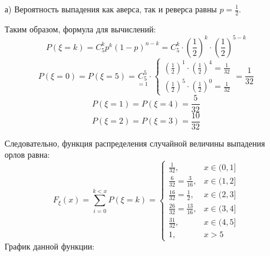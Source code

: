 \begin{enumerate}
	\item[а)] Вероятность выпадения как аверса, так и реверса равны $p = \frac{1}{2}$. 
	
		Таким образом, формула для вычислений:
		\[ P(\xi = k) = C_5^k p^k (1 - p)^{n-k} = C_5^k \cdot \left(\frac{1}{2}\right)^k \cdot \left(\frac{1}{2}\right)^{5-k} \]
		\[ P(\xi = 0) = P(\xi = 5) = \underset{=1}{C_5^5} \cdot 
		\begin{cases}
			\left(\frac{1}{2}\right)^1 \cdot \left(\frac{1}{2}\right)^4 = \frac{1}{32} \\
			\left(\frac{1}{2}\right)^5 \cdot \left(\frac{1}{2}\right)^0 = \frac{1}{32}
		\end{cases}
		= \frac{1}{32}
		\]
		\[ P(\xi = 1) = P(\xi = 4) = \frac{5}{32} \]
		\[ P(\xi = 2) = P(\xi = 3) = \frac{10}{32} \]
		
		Следовательно, функция распределения случайной величины выпадения орлов равна:
		\[
		F_{\xi}(x) = \sum_{i=0}^{k<x} P(\xi = k) =
		\begin{cases}
			\frac{1}{32}, &x \in (0,1] \\
			\frac{6}{32} = \frac{3}{16}, &x \in (1,2] \\
			\frac{16}{32} = \frac{1}{2}, &x \in (2,3] \\
			\frac{26}{32} = \frac{13}{16}, &x \in (3,4] \\
			\frac{31}{32}, &x \in (4,5] \\
			1, &x > 5
		\end{cases}
		\]
		График данной функции:
		\begin{figure}[H]
		\end{figure}


\end{enumerate}
